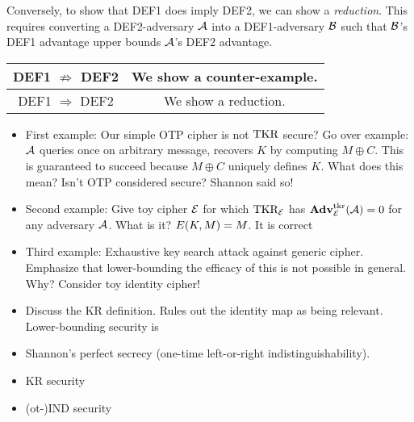 Conversely, to show that DEF1 does imply DEF2, we can show a \textit{reduction}. This requires converting a DEF2-adversary ${\mathcal A}$ into a DEF1-adversary ${\mathcal B}$ such that ${\mathcal B}$'s DEF1 advantage upper bounds ${\mathcal A}$'s DEF2 advantage. 


\begin{table}
	\centering
	\begin{tabular}{c | c}
		DEF1 $\not \Rightarrow$ DEF2 & We show a counter-example. \\ \hline
		DEF1 $\Rightarrow$ DEF2 & We show a reduction.
	\end{tabular}
\end{table}

\begin{itemize}
	\item First example: Our simple OTP cipher is not $\textnormal{TKR}$ secure? Go over example: ${\mathcal A}$
	queries once on arbitrary message, recovers $K$ by computing $M \oplus C$. This
	is guaranteed to succeed because $M \oplus C$ uniquely defines $K$. What does
	this mean? Isn't OTP considered secure? Shannon said so!
	\item Second example: Give toy cipher ${\cal E}$ for which $\textnormal{TKR}_{\cal E}$ has
	$\mathbf{Adv}^{\mathrm{tkr}}_{{\cal E}}({\mathcal A}) = 0$ for any adversary ${\mathcal A}$. What is it?
	$E(K,M) = M$. It is correct 
	\item Third example: Exhaustive key search attack against generic
	cipher. Emphasize that lower-bounding the efficacy of this is not possible in
	general. Why? Consider toy identity cipher! 
	\item Discuss the KR definition. Rules out the
	identity map as being relevant. Lower-bounding security is 
	\item Shannon's perfect secrecy (one-time left-or-right indistinguishability). 
\end{itemize}


\begin{itemize}
	\item KR security
	\item (ot-)IND security
\end{itemize}


\begin{figure}[p]
\end{figure}

